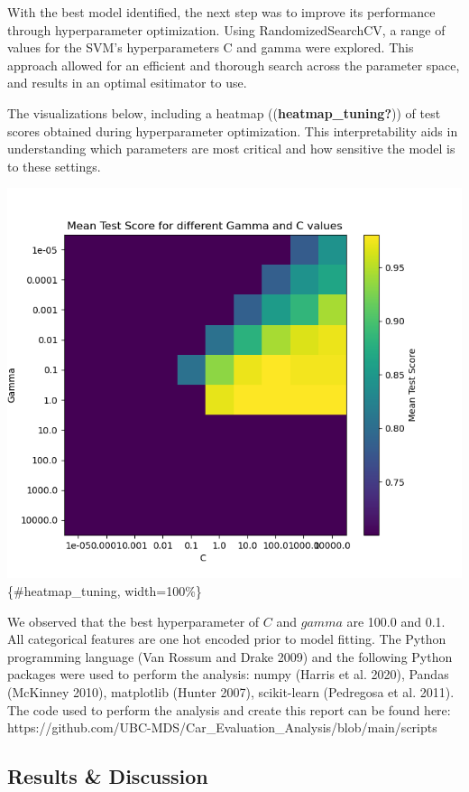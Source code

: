 \documentclass[
  letterpaper,
  DIV=11,
  numbers=noendperiod]{scrartcl}
\begin{document}
With the best model identified, the next step was to improve its
performance through hyperparameter optimization. Using
RandomizedSearchCV, a range of values for the SVM's hyperparameters C
and gamma were explored. This approach allowed for an efficient and
thorough search across the parameter space, and results in an optimal
esitimator to use.

The visualizations below, including a heatmap
((\textbf{heatmap\_tuning?})) of test scores obtained during
hyperparameter optimization. This interpretability aids in understanding
which parameters are most critical and how sensitive the model is to
these settings.

\includegraphics{../results/figures/car_hyperparameter.png}\{\#heatmap\_tuning,
width=100\%\}

We observed that the best hyperparameter of \(C\) and \(gamma\) are
100.0 and 0.1. All categorical features are one hot encoded prior to
model fitting. The Python programming language (Van Rossum and Drake
2009) and the following Python packages were used to perform the
analysis: numpy (Harris et al. 2020), Pandas (McKinney 2010), matplotlib
(Hunter 2007), scikit-learn (Pedregosa et al. 2011). The code used to
perform the analysis and create this report can be found here:
https://github.com/UBC-MDS/Car\_Evaluation\_Analysis/blob/main/scripts

\subsection{Results \& Discussion}\label{results-discussion}
\end{document}
